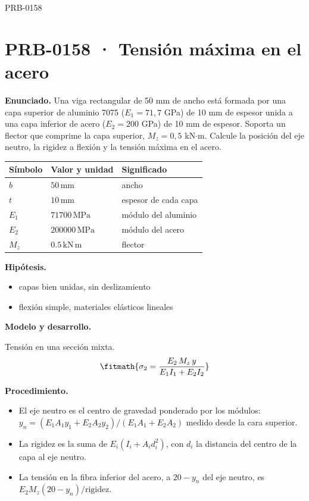 \begin{studiumworked}{PRB-0158}

\section{PRB-0158 · Tensión máxima en el acero}

\textbf{Enunciado.} Una viga rectangular de 50 mm de ancho está formada por una capa superior de aluminio 7075 ($E_1 = 71{,}7$ GPa) de 10 mm de espesor unida a una capa inferior de acero ($E_2 = 200$ GPa) de 10 mm de espesor. Soporta un flector que comprime la capa superior, $M_z = 0{,}5$ kN$\cdot$m. Calcule la posición del eje neutro, la rigidez a flexión y la tensión máxima en el acero.

\par\medskip\noindent\begin{tabular}{@{}p{.18\linewidth}p{.26\linewidth}p{.48\linewidth}@{}}
\toprule Símbolo & Valor y unidad & Significado\\\midrule
$b$ & $50\,\mathrm{mm}$ & ancho\\
$t$ & $10\,\mathrm{mm}$ & espesor de cada capa\\
$E_{1}$ & $71700\,\mathrm{MPa}$ & módulo del aluminio\\
$E_{2}$ & $200000\,\mathrm{MPa}$ & módulo del acero\\
$M_{z}$ & $0.5\,\mathrm{kN\,m}$ & flector\\
\bottomrule\end{tabular}\par\medskip

\textbf{Hipótesis.}\begin{itemize}\item capas bien unidas, sin deslizamiento
\item flexión simple, materiales elásticos lineales\end{itemize}

\textbf{Modelo y desarrollo.}

Tensión en una sección mixta.\[\fitmath{\sigma_2 = \frac{E_2\,M_z\,y}{E_1 I_1 + E_2 I_2}}\]

\textbf{Procedimiento.}\begin{itemize}\item El eje neutro es el centro de gravedad ponderado por los módulos: $y_n = (E_1 A_1 y_1 + E_2 A_2 y_2)/(E_1 A_1 + E_2 A_2)$ medido desde la cara superior.
\item La rigidez es la suma de $E_i (I_i + A_i d_i^2)$, con $d_i$ la distancia del centro de la capa al eje neutro.
\item La tensión en la fibra inferior del acero, a $20 - y_n$ del eje neutro, es $E_2 M_z (20 - y_n)/\text{rigidez}$.\end{itemize}


\end{studiumworked}
